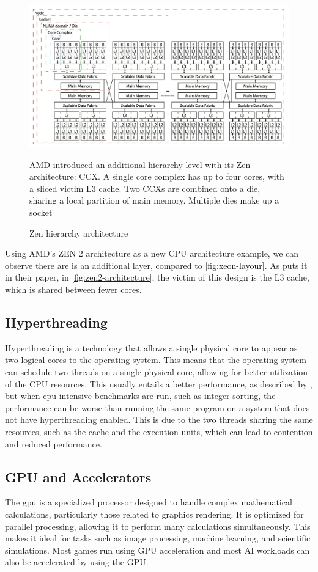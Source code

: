 \begin{figure}
    \centering
    \includegraphics[width=0.85\linewidth]{img/ccx-zen2-layout.png}
    \caption{Zen hierarchy architecture}{AMD introduced an additional hierarchy level with its Zen architecture: \gls{CCX}. A single core complex has up to four cores, with a sliced victim L3 cache. Two \glspl{CCX} are combined onto a die, sharing a local partition of main memory. Multiple dies make up a socket}
    \label{fig:zen2-architecture}
\end{figure}

Using AMD's ZEN 2 architecture as a new CPU architecture example, we can observe there are is an additional layer, compared to \autoref{fig:xeon-layour}. As \textcite{zen2-architecture} puts it in their paper, in \autoref{fig:zen2-architecture}, the victim of this design is the L3 cache, which is shared between fewer cores.


\subsection{Hyperthreading}
\label{sec:hyperthreading}
Hyperthreading is a technology that allows a single physical core to appear as two logical cores to the operating system. This means that the operating system can schedule two threads on a single physical core, allowing for better utilization of the CPU resources. This usually entails a better performance, as described by \textcite{hyperthreading}, but when \gls{cpu} intensive benchmarks are run, such as integer sorting, the performance can be worse than running the same program on a system that does not have hyperthreading enabled. This is due to the two threads sharing the same resources, such as the cache and the execution units, which can lead to contention and reduced performance.


\subsection{GPU and Accelerators}
\label{sec:gpu-accelerators}
The \gls{gpu} is a specialized processor designed to handle complex mathematical calculations, particularly those related to graphics rendering. It is optimized for parallel processing, allowing it to perform many calculations simultaneously. This makes it ideal for tasks such as image processing, machine learning, and scientific simulations. Most games run using GPU acceleration and most AI workloads can also be accelerated by using the GPU. 

